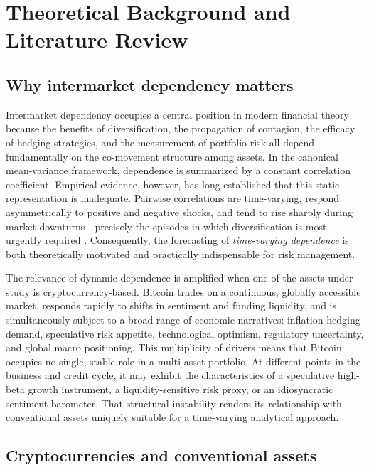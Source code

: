 \section{Theoretical Background and Literature Review}

\subsection{Why intermarket dependency matters}

Intermarket dependency occupies a central position in modern financial theory because the benefits of diversification, the propagation of contagion, the efficacy of hedging strategies, and the measurement of portfolio risk all depend fundamentally on the co-movement structure among assets. In the canonical mean-variance framework, dependence is summarized by a constant correlation coefficient. Empirical evidence, however, has long established that this static representation is inadequate. Pairwise correlations are time-varying, respond asymmetrically to positive and negative shocks, and tend to rise sharply during market downturns---precisely the episodes in which diversification is most urgently required \cite{longin2001}. Consequently, the forecasting of \emph{time-varying dependence} is both theoretically motivated and practically indispensable for risk management.

The relevance of dynamic dependence is amplified when one of the assets under study is cryptocurrency-based. Bitcoin trades on a continuous, globally accessible market, responds rapidly to shifts in sentiment and funding liquidity, and is simultaneously subject to a broad range of economic narratives: inflation-hedging demand, speculative risk appetite, technological optimism, regulatory uncertainty, and global macro positioning. This multiplicity of drivers means that Bitcoin occupies no single, stable role in a multi-asset portfolio. At different points in the business and credit cycle, it may exhibit the characteristics of a speculative high-beta growth instrument, a liquidity-sensitive risk proxy, or an idiosyncratic sentiment barometer. That structural instability renders its relationship with conventional assets uniquely suitable for a time-varying analytical approach.

\subsection{Cryptocurrencies and conventional assets}

